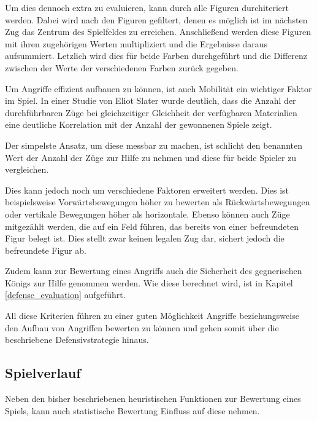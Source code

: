 Um dies dennoch extra zu evaluieren, kann durch alle Figuren durchiteriert werden. Dabei wird nach den Figuren gefiltert, denen es möglich ist im nächsten Zug das Zentrum des Spielfeldes zu erreichen. Anschließend werden diese Figuren mit ihren zugehörigen Werten multipliziert und die Ergebnisse daraus aufsummiert. Letzlich wird dies für beide Farben durchgeführt und die Differenz zwischen der Werte der verschiedenen Farben zurück gegeben. \cite{O.V.2019}


Um Angriffe effizient aufbauen zu können, ist auch Mobilität ein wichtiger Faktor im Spiel. In einer Studie von Eliot Slater wurde deutlich, dass die Anzahl der durchführbaren Züge bei gleichzeitiger Gleichheit der verfügbaren Materialien eine deutliche Korrelation mit der Anzahl der gewonnenen Spiele zeigt. \cite{Slater1988}

Der simpelste Ansatz, um diese messbar zu machen, ist schlicht den benannten Wert der Anzahl der Züge zur Hilfe zu nehmen und diese für beide Spieler zu vergleichen.

Dies kann jedoch noch um verschiedene Faktoren erweitert werden. Dies ist beispielsweise Vorwärtsbewegungen höher zu bewerten als Rückwärtsbewegungen oder vertikale Bewegungen höher als horizontale. Ebenso können auch Züge mitgezählt werden, die auf ein Feld führen, das bereits von einer befreundeten Figur belegt ist. Dies stellt zwar keinen legalen Zug dar, sichert jedoch die befreundete Figur ab. \cite{O.V:2019}


Zudem kann zur Bewertung eines Angriffs auch die Sicherheit des gegnerischen Königs zur Hilfe genommen werden. Wie diese berechnet wird, ist in Kapitel \ref{defense_evaluation} aufgeführt.

All diese Kriterien führen zu einer guten Möglichkeit Angriffe beziehungsweise den Aufbau von Angriffen bewerten zu können und gehen somit über die beschriebene Defensivstrategie hinaus.


\subsection{Spielverlauf}\label{history_evaluation}

Neben den bisher beschriebenen heuristischen Funktionen zur Bewertung eines Spiels, kann auch statistische Bewertung Einfluss auf diese nehmen.

